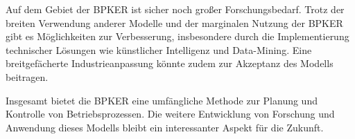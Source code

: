 Auf dem Gebiet der BPKER ist sicher noch gro{\ss}er Forschungsbedarf. Trotz der breiten Verwendung anderer Modelle und der marginalen Nutzung der BPKER gibt es Möglichkeiten zur Verbesserung, insbesondere durch die Implementierung technischer Lösungen wie künstlicher Intelligenz und Data-Mining. Eine breitgefächerte Industrieanpassung könnte zudem zur Akzeptanz des Modells beitragen.

Insgesamt bietet die BPKER eine umfängliche Methode zur Planung und Kontrolle von Betriebsprozessen. Die weitere Entwicklung von Forschung und Anwendung dieses Modells bleibt ein interessanter Aspekt für die Zukunft.